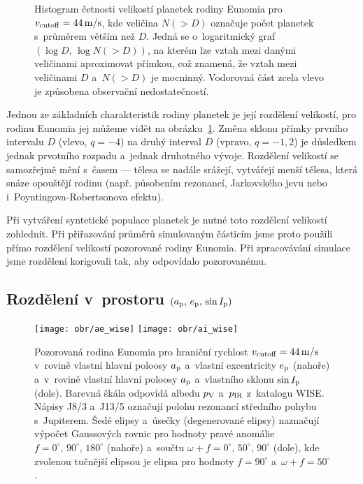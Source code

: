 \documentclass[A4paper, 12pt, oneside, openany]{book}
\begin{document}
\begin{figure}
\begin{subfigure}[b]{0.45\textwidth}
	\end{subfigure}
	\caption{Histogram četnosti velikostí planetek rodiny Eunomia pro $v_{\rm cutoff}=44\,{\rm m/s}$, kde veličina $N({>}D)$ označuje počet planetek s~průměrem větším než $D$. Jedná se o~logaritmický graf $(\log D,\,\log N({>}D))$, na kterém lze vztah mezi danými veličinami aproximovat přímkou, což znamená, že vztah mezi veličinami $D$ a~$N({>}D)$ je mocninný. Vodorovná část zcela vlevo je způsobena observační nedostatečností.}
	\label{fig:sfd}
\end{figure}

Jednou ze základních charakteristik rodiny planetek je její rozdělení velikostí, pro rodinu Eunomia jej můžeme vidět na obrázku~\ref{fig:sfd}. Změna sklonu přímky prvního intervalu $D$ (vlevo, $q=-4$) na druhý interval $D$ (vpravo, $q=-1,2$) je důsledkem jednak prvotního rozpadu a~jednak druhotného vývoje. Rozdělení velikostí se samozřejmě mění s~časem --- tělesa se nadále srážejí, vytvářejí menší tělesa, která snáze opouštějí rodinu (např. působením rezonancí, Jarkovského jevu nebo i~Poyntingova-Robertsonova efektu).

Při vytváření syntetické populace planetek je nutné toto rozdělení velikostí zohlednit. Při přiřazování průměrů simulovaným částicím jsme proto použili přímo rozdělení velikostí pozorované rodiny Eunomia. Při zpracovávání simulace jsme rozdělení korigovali tak, aby odpovídalo pozorovanému.

\subsection{Rozdělení v~prostoru $(a_{\rm p},\,e_{\rm p},\,\sin I_{\rm p})$}
\begin{figure}
	\centering
	\texttt{[image: obr/ae\_wise]}
	\texttt{[image: obr/ai\_wise]}
	\caption{Pozorovaná rodina Eunomia pro hraniční rychlost $v_{\rm cutoff} = 44\,{\rm m/s}$ v~rovině vlastní hlavní poloosy $a_{\rm p}$ a~vlastní excentricity $e_{\rm p}$ (nahoře) a~v~rovině vlastní hlavní poloosy $a_{\rm p}$ a~vlastního sklonu $\sin I_{\rm p}$ (dole). Barevná škála odpovídá albedu $p_{\rm V}$ a~$p_{\rm IR}$ z~katalogu WISE\@. Nápisy J8/3 a~J13/5 označují polohu rezonancí středního pohybu s~Jupiterem. Šedé elipsy a~úsečky (degenerované elipsy) naznačují výpočet Gaussových rovnic pro hodnoty pravé anomálie $f=0^\circ,\,90^\circ,\,180^\circ$ (nahoře) a~součtu $\omega+f=0^\circ,\, 50^\circ,\, 90^\circ$ (dole), kde zvolenou tučnější elipsou je elipsa pro hodnoty $f=90^\circ$ a~$\omega+f=50^\circ$.}
	\label{fig:ae_ai_wise}
\end{figure}
\end{document}
